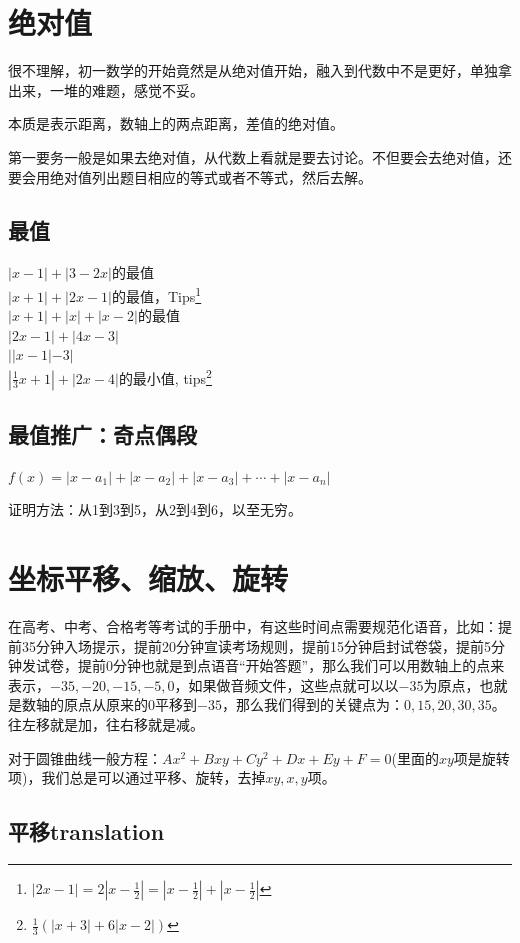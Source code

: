 \documentclass[../main.tex]{subfiles}
\begin{document}
\clearpage
\section{绝对值}

很不理解，初一数学的开始竟然是从绝对值开始，融入到代数中不是更好，单独拿出来，一堆的难题，感觉不妥。

本质是表示距离，数轴上的两点距离，差值的绝对值。

第一要务一般是如果去绝对值，从代数上看就是要去讨论。不但要会去绝对值，还要会用绝对值列出题目相应的等式或者不等式，然后去解。

\subsection{最值}
$|x-1|+ |3-2x|$的最值\\
$|x+1| + |2x-1|$的最值，Tips\footnote{$|2x-1| = 2|x-\frac{1}{2}|=|x-\frac{1}{2}|+|x-\frac{1}{2}|$}\\
$|x+1| + |x| + |x-2|$的最值\\
$|2x-1|+|4x-3|$\\
$||x-1|-3|$\\
$|\frac{1}{3}x+1|+|2x-4|$的最小值, tips\footnote{$\frac{1}{3}(|x+3|+6|x-2|)$}

\subsection{最值推广：奇点偶段}
$f(x) = |x-a_1| + |x-a_2|+ |x-a_3| + \cdots + |x-a_{n}| $

证明方法：从1到3到5，从2到4到6，以至无穷。

\clearpage
\section{坐标平移、缩放、旋转}
在高考、中考、合格考等考试的手册中，有这些时间点需要规范化语音，比如：提前35分钟入场提示，提前20分钟宣读考场规则，提前15分钟启封试卷袋，提前5分钟发试卷，提前0分钟也就是到点语音“开始答题”，那么我们可以用数轴上的点来表示，$-35, -20, -15, -5, 0$，如果做音频文件，这些点就可以以$-35$为原点，也就是数轴的原点从原来的$0$平移到$-35$，那么我们得到的关键点为：$0,15,20,30,35$。往左移就是加，往右移就是减。

对于圆锥曲线一般方程：$Ax^2+Bxy+Cy^2+Dx+Ey+F=0$(里面的$xy$项是旋转项)，我们总是可以通过平移、旋转，去掉$xy, x, y$项。

\subsection{平移translation}
\end{document}
